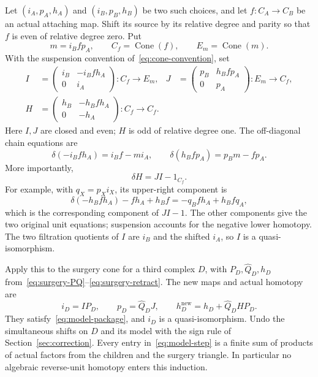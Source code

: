 \documentclass[11pt]{amsart}
\theoremstyle{definition}
\theoremstyle{remark}
\theoremstyle{plain}
\newcommand{\Cone}{\operatorname{Cone}}
\begin{document}
Let $(i_A,p_A,h_A)$ and $(i_B,p_B,h_B)$ be two such choices,
and let $f:C_A\to C_B$ be an actual attaching map. Shift its
source by its relative degree and parity so that $f$ is even
of relative degree zero. Put
\[
 m=i_Bfp_A,\qquad C_f=\Cone(f),\qquad E_m=\Cone(m).
\]
With the suspension convention of~\eqref{eq:cone-convention}, set
\begin{align}\label{eq:cone-change}
 I&=\begin{pmatrix}i_B&-i_Bfh_A\\0&i_A\end{pmatrix}:C_f\to E_m,
 &J&=\begin{pmatrix}p_B&h_Bfp_A\\0&p_A\end{pmatrix}:E_m\to C_f,\nonumber\\
 H&=\begin{pmatrix}h_B&-h_Bfh_A\\0&-h_A\end{pmatrix}:C_f\to C_f.
\end{align}
Here $I,J$ are closed and even; $H$ is odd of relative degree
one. The off-diagonal chain equations are
\[
 \delta(-i_Bfh_A)=i_Bf-mi_A,\qquad
 \delta(h_Bfp_A)=p_Bm-fp_A.
\]
More importantly,
\begin{equation}\label{eq:cone-change-unit}
 \delta H=JI-1_{C_f}.
\end{equation}
For example, with $q_X=p_Xi_X$, its upper-right component is
\[
 \delta(-h_Bfh_A)-fh_A+h_Bf
   =-q_Bfh_A+h_Bfq_A,
\]
which is the corresponding component of $JI-1$. The other
components give the two original unit equations; suspension
accounts for the negative lower homotopy. The two filtration
quotients of $I$ are $i_B$ and the shifted $i_A$, so $I$ is a
quasi-isomorphism.

Apply this to the surgery cone for a third complex $D$, with
$P_D,\widehat Q_D,h_D$ from~\eqref{eq:surgery-PQ}--\eqref{eq:surgery-retract}.
The new maps and actual homotopy are
\begin{equation}\label{eq:model-step}
 i_D=IP_D,\qquad p_D=\widehat Q_DJ,\qquad
 h_D^{\mathrm{new}}=h_D+\widehat Q_DHP_D.
\end{equation}
They satisfy~\eqref{eq:model-package}, and $i_D$ is a
quasi-isomorphism. Undo the simultaneous shifts on $D$ and
its model with the sign rule of Section~\ref{sec:correction}.
Every entry in~\eqref{eq:model-step} is a finite sum of products
of actual factors from the children and the surgery triangle.
In particular no algebraic reverse-unit homotopy enters this
induction.
\end{document}
